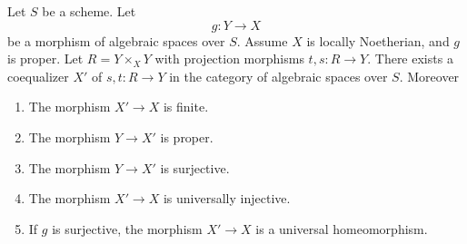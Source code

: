 %
\begin{lemma}
\label{lemma-coequalizer}
Let $S$ be a scheme. Let
$$
g : Y \longrightarrow X
$$
be a morphism of algebraic spaces over $S$. Assume $X$ is locally Noetherian,
and $g$ is proper. Let $R = Y \times_X Y$ with projection morphisms
$t, s : R \to Y$. There exists a coequalizer $X'$ of $s, t : R \to Y$
in the category of algebraic spaces over $S$. Moreover
\begin{enumerate}
\item The morphism $X' \to X$ is finite.
\item The morphism $Y \to X'$ is proper.
\item The morphism $Y \to X'$ is surjective.
\item The morphism $X' \to X$ is universally injective.
\item If $g$ is surjective, the morphism $X' \to X$
is a universal homeomorphism.
\end{enumerate}
\end{lemma}


